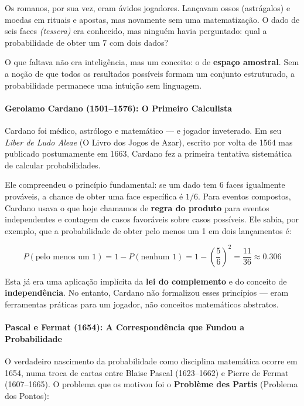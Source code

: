 \documentclass{tufte-handout}
\begin{document}
Os romanos, por sua vez, eram ávidos jogadores. Lançavam ossos (astrágalos) e moedas em
rituais e apostas, mas novamente sem uma matematização. O dado de seis faces \textit{(tessera)}
era conhecido, mas ninguém havia perguntado: qual a probabilidade de obter um 7 com dois dados?

O que faltava não era inteligência, mas um conceito: o de \textbf{espaço amostral}.
Sem a noção de que todos os resultados possíveis formam um conjunto estruturado, a
probabilidade permanece uma intuição sem linguagem.

\paragraph{Gerolamo Cardano (1501--1576): O Primeiro Calculista}

Cardano foi médico, astrólogo e matemático --- e jogador inveterado. Em seu \textit{Liber de Ludo Aleae}
(O Livro dos Jogos de Azar), escrito por volta de 1564 mas publicado postumamente em 1663,
Cardano fez a primeira tentativa sistemática de calcular probabilidades.

Ele compreendeu o princípio fundamental: se um dado tem 6 faces igualmente prováveis, a
chance de obter uma face específica é $1/6$. Para eventos compostos, Cardano usava o que hoje
chamamos de \textbf{regra do produto} para eventos independentes e contagem de casos
favoráveis sobre casos possíveis. Ele sabia, por exemplo, que a probabilidade de obter pelo
menos um 1 em dois lançamentos é:

\[
P(\text{pelo menos um 1}) = 1 - P(\text{nenhum 1}) = 1 - \left(\frac{5}{6}\right)^2 = \frac{11}{36} \approx 0.306
\]

Esta já era uma aplicação implícita da \textbf{lei do complemento} e do conceito de
\textbf{independência}. No entanto, Cardano não formalizou esses princípios --- eram
ferramentas práticas para um jogador, não conceitos matemáticos abstratos.

\paragraph{Pascal e Fermat (1654): A Correspondência que Fundou a Probabilidade}

O verdadeiro nascimento da probabilidade como disciplina matemática ocorre em 1654,
numa troca de cartas entre Blaise Pascal (1623--1662) e Pierre de Fermat (1607--1665).
O problema que os motivou foi o \textbf{Problème des Partis} (Problema dos Pontos):
\end{document}
